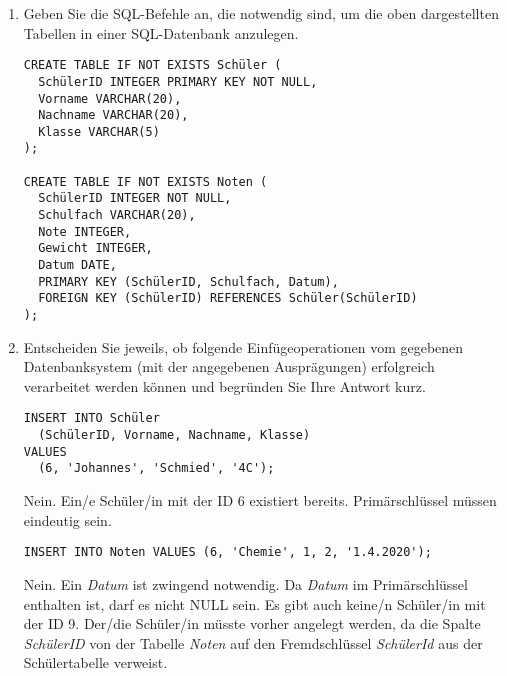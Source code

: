 \documentclass{bschlangaul-aufgabe}
\begin{document}
\begin{enumerate}


\item Geben Sie die SQL-Befehle an, die notwendig sind, um die oben
dargestellten Tabellen in einer SQL-Datenbank anzulegen.

\begin{bAntwort}
\begin{verbatim}
CREATE TABLE IF NOT EXISTS Schüler (
  SchülerID INTEGER PRIMARY KEY NOT NULL,
  Vorname VARCHAR(20),
  Nachname VARCHAR(20),
  Klasse VARCHAR(5)
);

CREATE TABLE IF NOT EXISTS Noten (
  SchülerID INTEGER NOT NULL,
  Schulfach VARCHAR(20),
  Note INTEGER,
  Gewicht INTEGER,
  Datum DATE,
  PRIMARY KEY (SchülerID, Schulfach, Datum),
  FOREIGN KEY (SchülerID) REFERENCES Schüler(SchülerID)
);
\end{verbatim}
\end{bAntwort}


\item Entscheiden Sie jeweils, ob folgende Einfügeoperationen vom
gegebenen Datenbanksystem (mit der angegebenen Ausprägungen) erfolgreich
verarbeitet werden können und begründen Sie Ihre Antwort kurz.

\begin{verbatim}
INSERT INTO Schüler
  (SchülerID, Vorname, Nachname, Klasse)
VALUES
  (6, 'Johannes', 'Schmied', '4C');
\end{verbatim}

\begin{bAntwort}
Nein. Ein/e Schüler/in mit der ID 6 existiert bereits. Primärschlüssel
müssen eindeutig sein.
\end{bAntwort}

\begin{verbatim}
INSERT INTO Noten VALUES (6, 'Chemie', 1, 2, '1.4.2020');
\end{verbatim}

\begin{bAntwort}
Nein. Ein \emph{Datum} ist zwingend notwendig. Da \emph{Datum} im
Primärschlüssel enthalten ist, darf es nicht NULL sein. Es gibt auch
keine/n Schüler/in mit der ID 9. Der/die Schüler/in  müsste vorher
angelegt werden, da die Spalte \emph{SchülerID} von der Tabelle
\emph{Noten} auf den Fremdschlüssel \emph{SchülerId} aus der
Schülertabelle verweist.
\end{bAntwort}


\end{enumerate}
\end{document}

